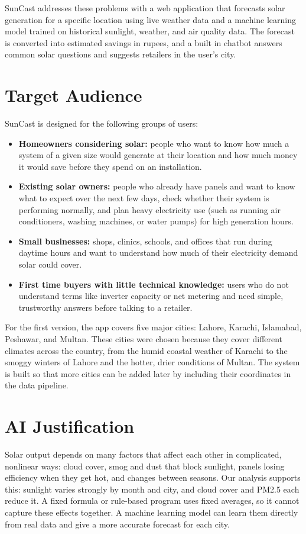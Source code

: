 \documentclass[11pt,a4paper]{article}
\begin{document}
SunCast addresses these problems with a web application that forecasts solar generation for a specific location using live weather data and a machine learning model trained on historical sunlight, weather, and air quality data. The forecast is converted into estimated savings in rupees, and a built in chatbot answers common solar questions and suggests retailers in the user's city.


\section{Target Audience}

SunCast is designed for the following groups of users:
 
\begin{itemize}
    \item \textbf{Homeowners considering solar:} people who want to know how much a system of a given size would generate at their location and how much money it would save before they spend on an installation.
    \item \textbf{Existing solar owners:} people who already have panels and want to know what to expect over the next few days, check whether their system is performing normally, and plan heavy electricity use (such as running air conditioners, washing machines, or water pumps) for high generation hours.
    \item \textbf{Small businesses:} shops, clinics, schools, and offices that run during daytime hours and want to understand how much of their electricity demand solar could cover.
    \item \textbf{First time buyers with little technical knowledge:} users who do not understand terms like inverter capacity or net metering and need simple, trustworthy answers before talking to a retailer.
\end{itemize}
 
For the first version, the app covers five major cities: Lahore, Karachi, Islamabad, Peshawar, and Multan. These cities were chosen because they cover different climates across the country, from the humid coastal weather of Karachi to the smoggy winters of Lahore and the hotter, drier conditions of Multan. The system is built so that more cities can be added later by including their coordinates in the data pipeline.


\section{AI Justification}
Solar output depends on many factors that affect each other in complicated,
nonlinear ways: cloud cover, smog and dust that block sunlight, panels losing
efficiency when they get hot, and changes between seasons. Our analysis
supports this: sunlight varies strongly by month and city, and cloud cover
and PM2.5 each reduce it. A fixed formula or rule-based program uses fixed
averages, so it cannot capture these effects together. A machine learning
model can learn them directly from real data and give a more accurate
forecast for each city.
\end{document}
